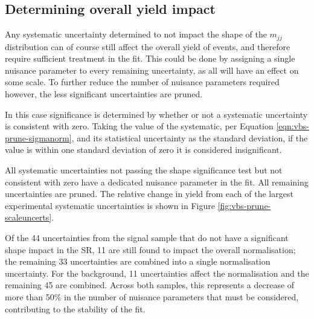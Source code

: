 \subsection{Determining overall yield impact}

Any systematic uncertainty determined to not impact the shape of the $m_{jj}$
distribution can of course still affect the overall yield of events, and
therefore require sufficient treatment in the fit. This could be done by
assigning a single nuisance parameter to every remaining uncertainty, as all
will have an effect on some scale. To further reduce the number of nuisance parameters
required however, the less significant uncertainties are pruned.

In this case significance is determined by whether or not a systematic
uncertainty is consistent with zero. Taking the value of the systematic, per
Equation \ref{eqn:vbs-prune-sigmanorm}, and its statistical uncertainty as the
standard deviation, if the value is within one standard deviation of zero it is
considered insignificant.

All systematic uncertainties not passing the shape significance test but not
consistent with zero have a dedicated nuisance parameter in the fit. All
remaining uncertainties are pruned.
The relative change in yield from each of the largest experimental systematic
uncertainties is shown in Figure \ref{fig:vbs-prune-scaleuncerts}.

Of the 44 uncertainties from the signal sample that do not have a significant
shape impact in the \ac{SR}, 11 are still found to impact the overall
normalisation; the remaining 33 uncertainties are combined into a single
normalisation uncertainty. For the \QCDZy background, 11 uncertainties
affect the normalisation and the remaining 45 are combined. Across both samples,
this represents a decrease of more than 50\% in the number of nuisance
parameters that must be considered, contributing to the stability of the fit.
